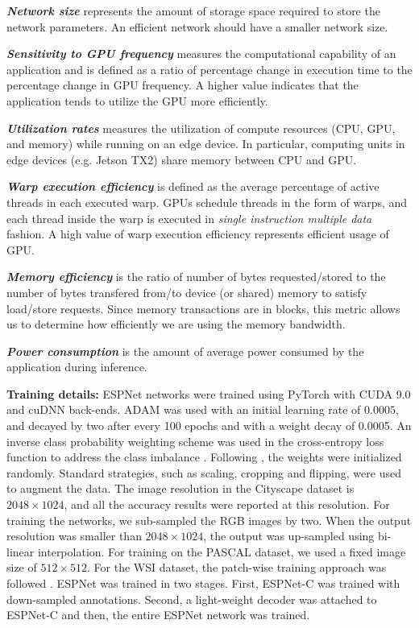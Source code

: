 \documentclass[runningheads]{llncs}
\begin{document}
\noindent \textbf{\textit{Network size}} represents the amount of storage space required to store the network parameters. An efficient network should have a smaller network size. 

\noindent \textbf{\textit{Sensitivity to GPU frequency}} measures the computational capability of an application and is defined as a ratio of percentage change in execution time to the percentage change in GPU frequency. A higher value indicates that the application tends to utilize the GPU more efficiently.

\noindent \textbf{\textit{Utilization rates}} measures the utilization of compute resources (CPU, GPU, and memory) while running on an edge device. In particular, computing units in edge devices (e.g. Jetson TX2) share memory between CPU and GPU.

\noindent \textbf{\textit{Warp execution efficiency}} is defined as the average percentage of active threads in each executed warp. GPUs schedule threads in the form of warps, and each thread inside the warp is executed in \textit{single instruction multiple data} fashion. A high value of warp execution efficiency represents efficient usage of GPU.

\noindent \textbf{\textit{Memory efficiency}} is the ratio of number of bytes requested/stored to the number of bytes transfered from/to device (or shared) memory to satisfy load/store requests. Since memory transactions are in blocks, this metric allows us to determine how efficiently we are using the memory bandwidth.

\noindent \textbf{\textit{Power consumption}} is the amount of average power consumed by the application during inference.

\noindent \textbf{Training details:} ESPNet networks were trained using PyTorch \cite{paszke2017automatic} with CUDA 9.0 and cuDNN back-ends. ADAM \cite{kingma2014adam} was used with an initial learning rate of $0.0005$, and decayed by two after every 100 epochs and with a weight decay of 0.0005. An inverse class probability weighting scheme was used in the cross-entropy loss function to address the class imbalance \cite{paszke2016enet,romera2018erfnet}. Following \cite{paszke2016enet,romera2018erfnet}, the weights were initialized randomly. Standard strategies, such as scaling, cropping and flipping, were used to augment the data. The image resolution in the Cityscape dataset is $2048 \times 1024$, and all the accuracy results were reported at this resolution. For training the networks, we sub-sampled the RGB images by two.  When the output resolution was smaller than $2048 \times 1024$, the output was up-sampled using bi-linear interpolation. For training on the PASCAL dataset, we used a fixed image size of $512 \times 512$. For the WSI dataset, the patch-wise training approach was followed \cite{mehta2017learning}. ESPNet was trained in two stages. First, ESPNet-C was trained with down-sampled annotations. Second, a light-weight decoder was attached to ESPNet-C and then, the entire ESPNet network was trained.
\end{document}
